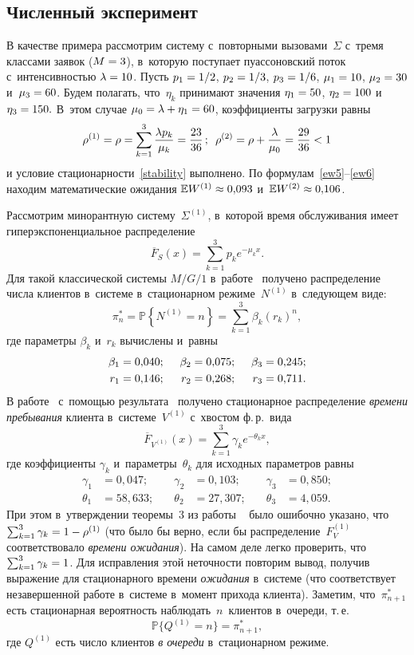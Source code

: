 \begin{multicols}{2}
\section{Численный эксперимент}

В качестве примера рассмотрим систему с~повторными вызовами~$\Sigma$ с~тремя 
классами заявок ($M\hm=3$), в~которую поступает пуассоновский поток 
с~ин\-тен\-сив\-ностью $\lambda\hm=10$.
Пусть
$p_1\hm=1/2$, $p_2\hm=1/3$, $p_3\hm=1/6$, $\mu_1\hm=10$, $\mu_2\hm=30$ и~$\mu_3\hm=60$.
Будем полагать, что~$\eta_k$ принимают значения
$\eta_1\hm=50$, $\eta_2\hm=100$ и~$\eta_3\hm=150.$
В~этом случае $\mu_0\hm=\lambda\hm+\eta_1\hm=60$,  коэффициенты загрузки \mbox{равны}
$$
\rho^{(1)}=\rho= \sum\limits_{k=1}^3 \displaystyle\frac{\displaystyle \lambda p_k\mathstrut}{\displaystyle \mu_k\mathstrut} = \displaystyle\frac{\displaystyle 23\mathstrut}{\displaystyle 36\mathstrut}\,; \enskip  
\rho^{(2)} = \rho+\displaystyle\frac{\displaystyle \lambda\mathstrut}{\displaystyle \mu_0\mathstrut} = \displaystyle\frac{\displaystyle 29\mathstrut}{\displaystyle 36\mathstrut} < 1
$$
и условие стационарности~\eqref{stability} выполнено. По 
формулам~\eqref{ew5}--\eqref{ew6} находим математические ожидания $\mathbb{E} W^{(1)} \hm\approx 0{,}093$ 
и~$\mathbb{E} W^{(2)} \hm\approx 0{,}106$.

Рассмотрим минорантную сис\-те\-му~$\Sigma^{(1)}$, в~которой время обслуживания 
имеет гиперэкспоненциальное распределение
$$
\overline F_S(x)=\sum\limits_{k=1}^3 p_k e^{-\mu_k x}.
$$
%
Для такой классической системы $M/G/1$ в~работе~\cite{rego} получено 
распределение числа клиентов в~сис\-те\-ме в~стационарном режиме~$N^{(1)}$ в~сле\-ду\-ющем виде:
$$
\pi_n^\ast=\mathbb{P}\left\{N^{(1)}=n\right\}=\sum\limits_{k=1}^3 \beta_k (r_k)^n,
$$
где параметры  $\beta_k$ и~$r_k$ вычислены и~равны
\begin{alignat*}{3}
    \beta_1&=0{,}040;&\enskip \beta_2&=0{,}075;&\enskip \beta_3&=0{,}245; \\
    r_1&=0{,}146;&\enskip r_2&=0{,}268;&\enskip r_3&=0{,}711.
\end{alignat*}
В работе~\cite{rego} с~помощью результата~\cite{haji}  получено стационарное 
распределение  \textit{времени пребывания} клиента в~сис\-те\-ме~$V^{(1)}$ с~хвостом 
ф.\,р.\ вида
$$
\overline F_{V^{(1)}}(x)=\sum\limits_{k=1}^3 \gamma_k e^{-\theta_k x},
$$
где коэффициенты $\gamma_k$  и~па\-ра\-мет\-ры~$\theta_k$  для исходных параметров 
\mbox{равны}
\begin{alignat*}{3}
\gamma_1&=0{,}047;&\quad \gamma_2&=0{,}103; &\quad \gamma_3&=0{,}850; \\
\theta_1&=58{,}633; &\quad \theta_2&=27{,}307;&\quad \theta_3&= 4{,}059.
\end{alignat*}
При этом в~утверждении теоремы~3 из работы ~\cite{rego} было  ошибочно указано, 
что $\sum\nolimits_{k=1}^3 \gamma_k\hm=1\hm-\rho^{(1)}$ (что было бы верно, если бы 
распределение~$F_V^{(1)}$ соответствовало  \textit{времени ожидания}). На самом 
деле легко проверить, что $\sum\nolimits_{k=1}^3 \gamma_k\hm=1$. Для исправления этой 
неточности повторим вывод, получив выражение для стационарного времени 
\textit{ожидания} в~сис\-те\-ме (что  соответствует незавершенной работе в~сис\-те\-ме 
в~момент прихода клиента). Заметим, что~$\pi_{n+1}^\ast$ есть стационарная 
вероятность наблюдать~$n$~клиентов в~очереди, т.\,е.
$$
\mathbb{P}\{Q^{(1)}=n\}=\pi_{n+1}^\ast,
$$
где $Q^{(1)}$ есть число клиентов \textit{в очереди} в~стационарном режиме.


\end{multicols}
